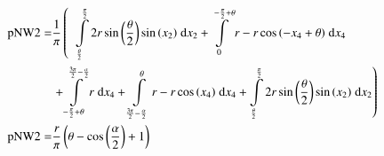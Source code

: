 \begin{align}
    \mathrm{pNW2} =&\frac{1}{\pi} \left(\;\;\int\limits_{\frac{\theta}{2}}^{\frac{\pi}{2}}2 r \sin{\left (\frac{\theta}{2} \right )} \sin{\left (x_{2} \right )}\;\mathrm{d}x_{2}+\int\limits_{0}^{- \frac{\pi}{2} + \theta}r - r \cos{\left (- x_{4} + \theta \right )}\;\mathrm{d}x_{4}\right.\notag\\
 &\left.+\int\limits_{- \frac{\pi}{2} + \theta}^{\frac{3 \pi}{2} - \frac{\alpha}{2}}r\;\mathrm{d}x_{4}+\int\limits_{\frac{3 \pi}{2} - \frac{\alpha}{2}}^{\theta}r - r \cos{\left (x_{4} \right )}\;\mathrm{d}x_{4}+\int\limits_{\frac{\theta}{2}}^{\frac{\pi}{2}}2 r \sin{\left (\frac{\theta}{2} \right )} \sin{\left (x_{2} \right )}\;\mathrm{d}x_{2}\right)\label{pNW2Def}\\
    \mathrm{pNW2} =& \frac{r}{\pi} \left(\theta - \cos{\left (\frac{\alpha}{2} \right )} + 1\right)\label{pNW2Sln}
\end{align}